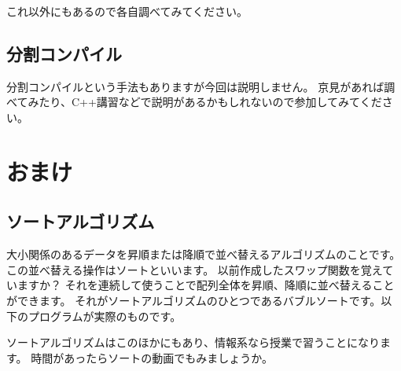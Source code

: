 これ以外にもあるので各自調べてみてください。

\subsection{分割コンパイル}
分割コンパイルという手法もありますが今回は説明しません。
京見があれば調べてみたり、C++講習などで説明があるかもしれないので参加してみてください。

\section{おまけ}
\subsection{ソートアルゴリズム}
大小関係のあるデータを昇順または降順で並べ替えるアルゴリズムのことです。
この並べ替える操作はソートといいます。
以前作成したスワップ関数を覚えていますか？
それを連続して使うことで配列全体を昇順、降順に並べ替えることができます。
それがソートアルゴリズムのひとつであるバブルソートです。以下のプログラムが実際のものです。

ソートアルゴリズムはこのほかにもあり、情報系なら授業で習うことになります。
時間があったらソートの動画でもみましょうか。